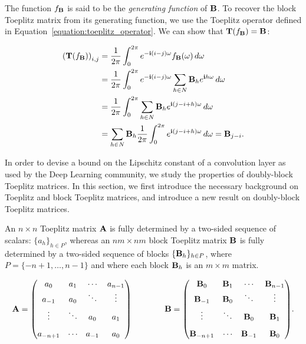 {The function $f_{\mathbf{B}}$ is said to be the \emph{generating function} of $\mathbf{B}$. To recover the block Toeplitz matrix from its generating function, we use the Toeplitz operator defined in Equation~\ref{equation:toeplitz_operator}. We can show that $\mathbf{T}(f_\mathbf{B}) = \mathbf{B}$:

\begingroup
\allowdisplaybreaks
\begin{align}
    \leftmat \Tmat(f_\Bmat) \rightmat_{i, j} &= \frac{1}{2\pi} \int_0^{2\pi} e^{-\ci (i-j)\omega} f_{\Bmat}(\omega) \,d\omega  \\
    &= \frac{1}{2\pi} \int_0^{2\pi} e^{-\ci (i-j) \omega} \sum_{h \in N} \Bmat_h e^{\ci h \omega} \,d\omega  \\
    &= \frac{1}{2\pi} \int_0^{2\pi} \sum_{h \in N} \Bmat_h e^{\ci (j - i + h) \omega} \,d\omega  \\
    &= \sum_{h \in N} \Bmat_h \frac{1}{2\pi} \int_0^{2\pi} e^{\ci (j - i + h) \omega} \,d\omega 
    = \Bmat_{j-i} .
\end{align}
\endgroup




In order to devise a bound on the Lipschitz constant of a convolution layer as used by the Deep Learning community, we study the properties of doubly-block Toeplitz matrices.
In this section, we first introduce the necessary background on Toeplitz and block Toeplitz matrices, and introduce a new result on doubly-block Toeplitz matrices.



An $n \times n$ Toeplitz matrix $\mathbf{A}$ is fully determined by a two-sided sequence of scalars: $\{a_h\}_{h \in P}$, whereas an $nm\times nm$ block Toeplitz matrix $\mathbf{B}$ is fully determined by a two-sided sequence of blocks $\{\mathbf{B}_h\}_{h \in P}$, where $P = \{-n+1,\dots, n-1 \}$ and where each block $\mathbf{B}_h$ is an $m \times m$ matrix.  

\begin{equation*}
  \Amat = \leftmatrix
    a_0 & a_{1} & \cdots & a_{n-1} \\ \vspace{0.1cm}
    a_{-1} & a_0 & \ddots & \vdots \\ \vspace{0.3cm}
   \vdots & \ddots & a_{0} & a_{1} \\ 
  a_{-n+1} & \cdots  & a_{-1}    & a_0 
  \rightmatrix \quad \quad \quad \quad 
    \Bmat = \leftmatrix
    \Bmat_0 & \Bmat_{1} & \cdots & \Bmat_{n-1} \\ \vspace{0.1cm}
    \Bmat_{-1} & \Bmat_0 & \ddots & \vdots \\ \vspace{0.3cm}
   \vdots & \ddots & \Bmat_0 & \Bmat_{1} \\ 
  \Bmat_{-n+1} & \cdots  & \Bmat_{-1}  & \Bmat_0 
  \rightmatrix.
\end{equation*}

}
